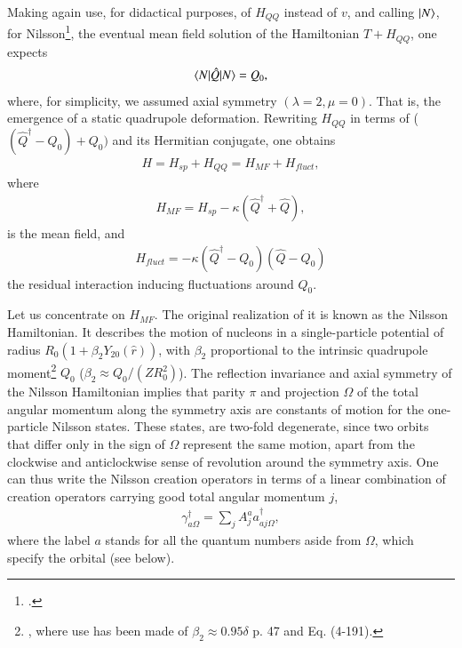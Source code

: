 Making again use, for didactical purposes, of $H_{QQ}$ instead of $v$, and calling $|{N} \rangle$, for Nilsson\footnote{\cite{Nilsson:55}.}, the eventual mean field solution of the Hamiltonian $T+H_{QQ}$, one expects
  \begin{align}\label{eq0.4.1}
\langle {N|\hat Q|N} \rangle=Q_0,
  \end{align}
where, for simplicity, we assumed axial symmetry $(\lambda=2,\mu=0)$. That is, the emergence of a static quadrupole deformation.
Rewriting $H_{QQ}$ in terms of ($(\hat Q^\dagger-Q_0)+Q_0)$ and its Hermitian conjugate, one obtains 
  \begin{align}\label{eq0.4.2}
H=H_{sp}+H_{QQ}=H_{MF}+H_{fluct},
\end{align}
where 
  \begin{align}\label{eq0.4.3}
H_{MF}=H_{sp}-\kappa(\hat Q^\dagger+\hat Q),
\end{align}
is the mean field, and
\begin{align}\label{eq0.4.4}
H_{fluct}=-\kappa(\hat Q^\dagger-Q_0)(\hat Q-Q_0)
\end{align}
the residual interaction inducing fluctuations around $Q_0$.


 Let us  concentrate on $H_{MF}$. The original realization of it is known as the Nilsson Hamiltonian. It describes the motion of nucleons in a single-particle potential of radius $R_0(1+\beta_2Y_{20}(\hat r))$, with $\beta_2$ proportional to the intrinsic quadrupole moment\footnote{\cite{Mottelson:59}, where use has been made of $\beta_2\approx0.95\delta$ \cite{Bohr:75} p. 47 and Eq. (4-191).} $Q_0$ ($\beta_2\approx Q_0/(ZR_0^2)$). The reflection invariance and axial symmetry of the Nilsson Hamiltonian implies that parity $\pi$ and projection $\Omega$ of the total angular momentum along the symmetry axis are constants of motion for the one-particle Nilsson states. These states, are two-fold degenerate, since two orbits that differ only in the sign of $\Omega$ represent the same motion, apart from the clockwise and anticlockwise sense of revolution around the symmetry axis. One can thus write the Nilsson creation operators in terms of a linear combination of creation operators carrying good total angular momentum $j$, 
\begin{align}\label{eq0.4.5}
\gamma^\dagger_{a\Omega}=\sum_jA_j^aa^\dagger_{aj\Omega},
\end{align}
where the label $a$ stands for all the quantum numbers aside from $\Omega$, which specify the orbital (see below). 

